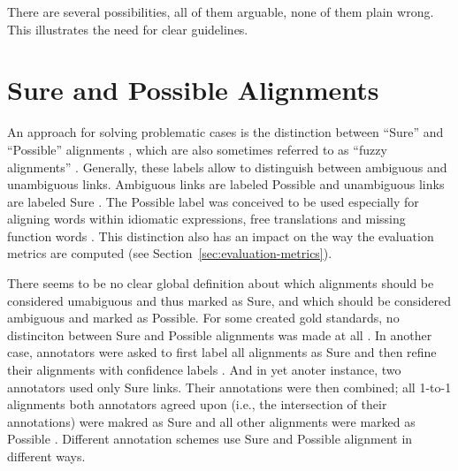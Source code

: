 There are several possibilities, all of them arguable, none of them plain wrong. This illustrates the need for clear guidelines.

\section{Sure and Possible Alignments}
\label{sec:sure_possible}
An approach for solving problematic cases is the distinction between \enquote{Sure} and \enquote{Possible} alignments \autocite{och-ney-2000-improved}, which are also sometimes referred to as \enquote{fuzzy alignments} \autocite{clematide2018}. 
Generally, these labels allow to distinguish between ambiguous and unambiguous links. 
Ambiguous links are labeled Possible and unambiguous links are labeled Sure \autocite{lambert2005}. 
The Possible label was conceived to be used especially for aligning words within idiomatic expressions, free translations and missing function words \autocite{och-ney-2000-improved}.
This distinction also has an impact on the way the evaluation metrics are computed (see Section~\ref{sec:evaluation-metrics}).

There seems to be no clear global definition about which alignments should be considered  umabiguous and thus marked as Sure, and which should be considered ambiguous and  marked as Possible. 
For some created gold standards, no distinciton between Sure and Possible alignments was made at all \autocite{clematide2018}. 
In another case, annotators were asked to first label all alignments as Sure and then refine their alignments with confidence labels \autocite{holmqvist-ahrenberg-2011-gold}. 
And in yet anoter instance, two annotators used only Sure links. 
Their annotations were then combined; all 1-to-1 alignments both annotators agreed upon (i.e., the intersection of their annotations) were makred as Sure and all other alignments were marked as Possible \autocite{steingrimsson-etal-2021-combalign}. Different annotation schemes use Sure and Possible alignment in different ways.


